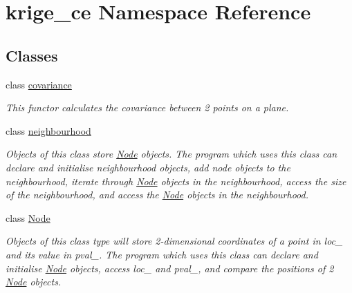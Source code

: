 \hypertarget{namespacekrige__ce}{}\section{krige\+\_\+ce Namespace Reference}
\label{namespacekrige__ce}
\subsection*{Classes}
\begin{DoxyCompactItemize}
\item 
class \hyperlink{classkrige__ce_1_1covariance}{covariance}
\begin{DoxyCompactList}\small\item\em This functor calculates the covariance between 2 points on a plane. \end{DoxyCompactList}\item 
class \hyperlink{classkrige__ce_1_1neighbourhood}{neighbourhood}
\begin{DoxyCompactList}\small\item\em Objects of this class store \hyperlink{classkrige__ce_1_1Node}{Node} objects. The program which uses this class can declare and initialise neighbourhood objects, add node objects to the neighbourhood, iterate through \hyperlink{classkrige__ce_1_1Node}{Node} objects in the neighbourhood, access the size of the neighbourhood, and access the \hyperlink{classkrige__ce_1_1Node}{Node} objects in the neighbourhood. \end{DoxyCompactList}\item 
class \hyperlink{classkrige__ce_1_1Node}{Node}
\begin{DoxyCompactList}\small\item\em Objects of this class type will store 2-\/dimensional coordinates of a point in loc\+\_\+ and its value in pval\+\_\+. The program which uses this class can declare and initialise \hyperlink{classkrige__ce_1_1Node}{Node} objects, access loc\+\_\+ and pval\+\_\+, and compare the positions of 2 \hyperlink{classkrige__ce_1_1Node}{Node} objects. \end{DoxyCompactList}\end{DoxyCompactItemize}
